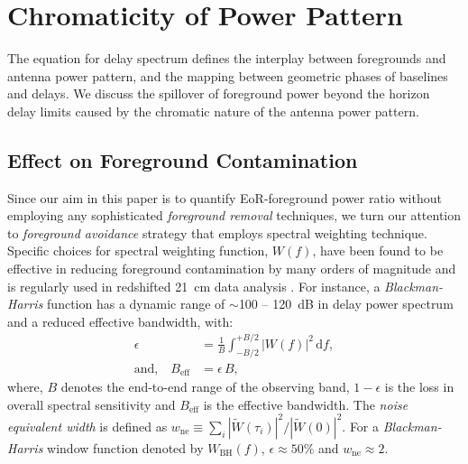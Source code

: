 \documentclass[preprint2,iop,numberedappendix,twocolappendix,appendixfloats]{emulateapj}
\newcommand{\dif}{\mathrm{d}}
\begin{document}
\section{Chromaticity of Power Pattern}\label{sec:beam-chromaticity}

The equation for delay spectrum defines the interplay between foregrounds and antenna power pattern, and the mapping between geometric phases of baselines and delays. We discuss the spillover of foreground power beyond the horizon delay limits caused by the chromatic nature of the antenna power pattern.


\subsection{Effect on Foreground Contamination}\label{sec:effects-fgdps}

Since our aim in this paper is to quantify EoR-foreground power ratio without employing any sophisticated {\it foreground removal} techniques, we turn our attention to {\it foreground avoidance} strategy that employs spectral weighting technique. Specific choices for spectral weighting function, $W(f)$, have been found to be effective in reducing foreground contamination by many orders of magnitude \citep{thy13} and is regularly used in redshifted 21~cm data analysis \citep{par12a,par12b}. For instance, a {\it Blackman-Harris} function \citep{har78} has a dynamic range of $\sim$100 -- 120~dB in delay power spectrum and a reduced effective bandwidth, with:
\begin{align}\label{eqn:Beff}
  \epsilon &= \frac{1}{B} \int_{-B/2}^{+B/2} |W(f)|^2\,\dif f, \\
  \textrm{and,}\quad B_\textrm{eff} &= \epsilon\,B,
\end{align}
where, $B$ denotes the end-to-end range of the observing band, $1-\epsilon$ is the loss in overall spectral sensitivity and $B_\textrm{eff}$ is the effective bandwidth. The {\it noise equivalent width} is defined as $w_\textrm{ne}\equiv \sum_i |\widetilde{W}(\tau_i)|^2 / |\widetilde{W}(0)|^2$. For a {\it Blackman-Harris} window function denoted by $W_\textrm{BH}(f)$, $\epsilon \approx 50\%$ and $w_\textrm{ne} \approx 2$. %
\end{document}
